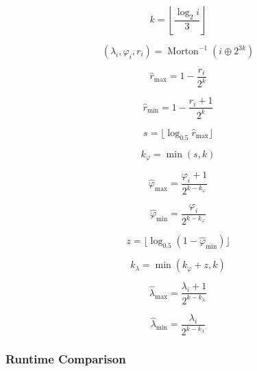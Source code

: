 \begin{equation*}
k = \left\lfloor \frac{ \log_{2}i}{3} \right\rfloor
\end{equation*}

\begin{equation*}
( \lambda_i, \varphi_i, r_i ) = \operatorname{Morton}^{-1} (i \oplus 2^{3k})
\end{equation*}

\begin{equation*}
\hat{r}_\mathrm{max} = 1 - \frac{r_i}{2^k}
\end{equation*}

\begin{equation*}
\hat{r}_\mathrm{min} = 1 - \frac{r_i + 1}{2^k}
\end{equation*}

\begin{equation*}
s = \lfloor \log_{0.5} \hat{r}_\mathrm{max} \rfloor
\end{equation*}

\begin{equation*}
k_\varphi = \min ( s, k )
\end{equation*}

\begin{equation*}
\hat{\varphi}_\mathrm{max} = \frac{\varphi_i + 1}{2^{k - k_\varphi}}
\end{equation*}

\begin{equation*}
\hat{\varphi}_\mathrm{min} = \frac{\varphi_i}{2^{k - k_\varphi}}
\end{equation*}

\begin{equation*}
z = \lfloor \log_{0.5} ( 1 - \hat{\varphi}_\mathrm{min} ) \rfloor
\end{equation*}

\begin{equation*}
k_\lambda = \min ( k_\varphi + z, k )
\end{equation*}

\begin{equation*}
\hat{\lambda}_\mathrm{max} = \frac{\lambda_i + 1}{2^{k - k_\lambda}}
\end{equation*}

\begin{equation*}
\hat{\lambda}_\mathrm{min} = \frac{\lambda_i}{2^{k - k_\lambda}}
\end{equation*}


\subsubsection{Runtime Comparison}


